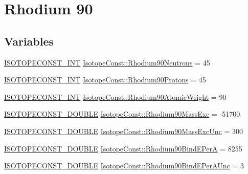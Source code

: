 \hypertarget{group___isotope_const-_rhodium-_rh90}{}\section{Rhodium 90}
\label{group___isotope_const-_rhodium-_rh90}
\subsection*{Variables}
\begin{DoxyCompactItemize}
\item 
\mbox{\hyperlink{group___isotope_const-_macros_ga5f18360b3e99483a35c32d789e62621c}{I\+S\+O\+T\+O\+P\+E\+C\+O\+N\+S\+T\+\_\+\+I\+NT}} \mbox{\hyperlink{group___isotope_const-_rhodium-_rh90_ga6461d4293dcbb788b1dc3f1106800faa}{Isotope\+Const\+::\+Rhodium90\+Neutrons}} = 45
\item 
\mbox{\hyperlink{group___isotope_const-_macros_ga5f18360b3e99483a35c32d789e62621c}{I\+S\+O\+T\+O\+P\+E\+C\+O\+N\+S\+T\+\_\+\+I\+NT}} \mbox{\hyperlink{group___isotope_const-_rhodium-_rh90_ga32972348311f5ee4a71fee2886e77b8e}{Isotope\+Const\+::\+Rhodium90\+Protons}} = 45
\item 
\mbox{\hyperlink{group___isotope_const-_macros_ga5f18360b3e99483a35c32d789e62621c}{I\+S\+O\+T\+O\+P\+E\+C\+O\+N\+S\+T\+\_\+\+I\+NT}} \mbox{\hyperlink{group___isotope_const-_rhodium-_rh90_ga1fbddc979637fa0a988e989f5730b247}{Isotope\+Const\+::\+Rhodium90\+Atomic\+Weight}} = 90
\item 
\mbox{\hyperlink{group___isotope_const-_macros_ga8f45a7272ce02c0b4c65c44636ed719a}{I\+S\+O\+T\+O\+P\+E\+C\+O\+N\+S\+T\+\_\+\+D\+O\+U\+B\+LE}} \mbox{\hyperlink{group___isotope_const-_rhodium-_rh90_gaf4738de1ea7ff68724e1dd96d70b34d3}{Isotope\+Const\+::\+Rhodium90\+Mass\+Exc}} = -\/51700
\item 
\mbox{\hyperlink{group___isotope_const-_macros_ga8f45a7272ce02c0b4c65c44636ed719a}{I\+S\+O\+T\+O\+P\+E\+C\+O\+N\+S\+T\+\_\+\+D\+O\+U\+B\+LE}} \mbox{\hyperlink{group___isotope_const-_rhodium-_rh90_gac4a891441ccd29e903047c7bb10352c2}{Isotope\+Const\+::\+Rhodium90\+Mass\+Exc\+Unc}} = 300
\item 
\mbox{\hyperlink{group___isotope_const-_macros_ga8f45a7272ce02c0b4c65c44636ed719a}{I\+S\+O\+T\+O\+P\+E\+C\+O\+N\+S\+T\+\_\+\+D\+O\+U\+B\+LE}} \mbox{\hyperlink{group___isotope_const-_rhodium-_rh90_gacd1e483e797f859ef15e0c5cef483e25}{Isotope\+Const\+::\+Rhodium90\+Bind\+E\+PerA}} = 8255
\item 
\mbox{\hyperlink{group___isotope_const-_macros_ga8f45a7272ce02c0b4c65c44636ed719a}{I\+S\+O\+T\+O\+P\+E\+C\+O\+N\+S\+T\+\_\+\+D\+O\+U\+B\+LE}} \mbox{\hyperlink{group___isotope_const-_rhodium-_rh90_ga91bd8f5db20772b1669cfc375897c14f}{Isotope\+Const\+::\+Rhodium90\+Bind\+E\+Per\+A\+Unc}} = 3

\end{DoxyCompactItemize}
